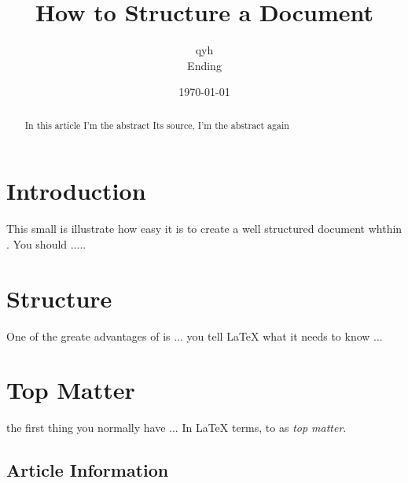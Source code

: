 \documentclass{article}
\begin{document}
\title{How to Structure a \LaTex{} Document}
\author{qyh\\Ending}
\date{\today}
\maketitle
\begin{abstract}
  In this article
  I'm the abstract
  Its \LateX{} source,
  I'm the abstract again
\end{abstract}

\section{Introduction}
\label{sec:introduction}

This small is illustrate how easy it is to create a well structured document whthin \LateX\cite{lamport94}. You should .....

\section{Structure}
\label{sec:structure}

One of the greate advantages of \LaTex{} is ...
you tell \LaTeX{} what it needs to know ...

\section{Top Matter}
\label{sec:top-matter}

the first thing you normally have ...
In \LaTeX{} terms,
to as \emph{top matter}.

\subsection{Article Information}
\label{sec:article-information}
\end{document}
